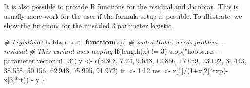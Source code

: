 \documentclass[
]{article}
\newenvironment{Shaded}{\begin{snugshade}}{\end{snugshade}}
\newcommand{\CommentTok}[1]{\textcolor[rgb]{0.56,0.35,0.01}{\textit{#1}}}
\newcommand{\ControlFlowTok}[1]{\textcolor[rgb]{0.13,0.29,0.53}{\textbf{#1}}}
\newcommand{\DecValTok}[1]{\textcolor[rgb]{0.00,0.00,0.81}{#1}}
\newcommand{\FloatTok}[1]{\textcolor[rgb]{0.00,0.00,0.81}{#1}}
\newcommand{\FunctionTok}[1]{\textcolor[rgb]{0.00,0.00,0.00}{#1}}
\newcommand{\NormalTok}[1]{#1}
\newcommand{\OtherTok}[1]{\textcolor[rgb]{0.56,0.35,0.01}{#1}}
\newcommand{\SpecialCharTok}[1]{\textcolor[rgb]{0.00,0.00,0.00}{#1}}
\newcommand{\StringTok}[1]{\textcolor[rgb]{0.31,0.60,0.02}{#1}}
\begin{document}
It is also possible to provide R functions for the residual and
Jacobian. This is usually more work for the user if the formula setup is
possible. To illustrate, we show the functions for the unscaled 3
parameter logistic.

\begin{Shaded}
\begin{Highlighting}[]
\CommentTok{\# Logistic3U}
\NormalTok{hobbs.res  }\OtherTok{\textless{}{-}}  \ControlFlowTok{function}\NormalTok{(x)\{ }\CommentTok{\# scaled Hobbs weeds problem {-}{-} residual}
  \CommentTok{\# This variant uses looping}
  \ControlFlowTok{if}\NormalTok{(}\FunctionTok{length}\NormalTok{(x) }\SpecialCharTok{!=} \DecValTok{3}\NormalTok{) }\FunctionTok{stop}\NormalTok{(}\StringTok{"hobbs.res {-}{-} parameter vector n!=3"}\NormalTok{)}
\NormalTok{  y  }\OtherTok{\textless{}{-}}  \FunctionTok{c}\NormalTok{(}\FloatTok{5.308}\NormalTok{, }\FloatTok{7.24}\NormalTok{, }\FloatTok{9.638}\NormalTok{, }\FloatTok{12.866}\NormalTok{, }\FloatTok{17.069}\NormalTok{, }\FloatTok{23.192}\NormalTok{, }\FloatTok{31.443}\NormalTok{, }
           \FloatTok{38.558}\NormalTok{, }\FloatTok{50.156}\NormalTok{, }\FloatTok{62.948}\NormalTok{, }\FloatTok{75.995}\NormalTok{, }\FloatTok{91.972}\NormalTok{)}
\NormalTok{  tt  }\OtherTok{\textless{}{-}}  \DecValTok{1}\SpecialCharTok{:}\DecValTok{12}
\NormalTok{  res  }\OtherTok{\textless{}{-}}\NormalTok{  x[}\DecValTok{1}\NormalTok{]}\SpecialCharTok{/}\NormalTok{(}\DecValTok{1}\SpecialCharTok{+}\NormalTok{x[}\DecValTok{2}\NormalTok{]}\SpecialCharTok{*}\FunctionTok{exp}\NormalTok{(}\SpecialCharTok{{-}}\NormalTok{x[}\DecValTok{3}\NormalTok{]}\SpecialCharTok{*}\NormalTok{tt)) }\SpecialCharTok{{-}}\NormalTok{ y}
\NormalTok{\}}


\end{Highlighting}
\end{Shaded}
\end{document}
